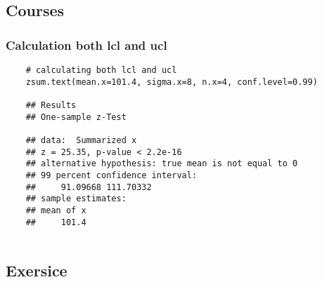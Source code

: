 \subsection{Courses}
\lstset{language=R}

\subsubsection{Calculation both lcl and ucl}
\begin{lstlisting}
    # calculating both lcl and ucl
    zsum.text(mean.x=101.4, sigma.x=8, n.x=4, conf.level=0.99)

    ## Results
    ## One-sample z-Test

    ## data:  Summarized x
    ## z = 25.35, p-value < 2.2e-16
    ## alternative hypothesis: true mean is not equal to 0
    ## 99 percent confidence interval:
    ##     91.09668 111.70332
    ## sample estimates:
    ## mean of x 
    ##     101.4 
    
\end{lstlisting}

\subsection{Exersice}

